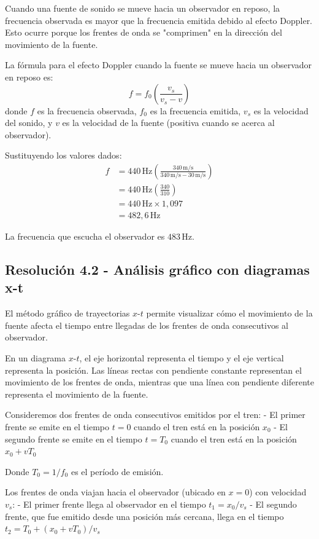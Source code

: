 \documentclass[
  11pt,
  letterpaper,
   addpoints,
   answers
  ]{exam}
\begin{document}
\begin{questions}
\begin{solution}
Cuando una fuente de sonido se mueve hacia un observador en reposo, la frecuencia observada es mayor que la frecuencia emitida debido al efecto Doppler. Esto ocurre porque los frentes de onda se "comprimen" en la dirección del movimiento de la fuente.

La fórmula para el efecto Doppler cuando la fuente se mueve hacia un observador en reposo es:
\begin{equation}
f = f_0 \left(\frac{v_s}{v_s - v}\right)
\end{equation}
donde $f$ es la frecuencia observada, $f_0$ es la frecuencia emitida, $v_s$ es la velocidad del sonido, y $v$ es la velocidad de la fuente (positiva cuando se acerca al observador).

Sustituyendo los valores dados:
\begin{align}
f &= 440\,\mathrm{Hz} \left(\frac{340\,\mathrm{m/s}}{340\,\mathrm{m/s} - 30\,\mathrm{m/s}}\right) \\
&= 440\,\mathrm{Hz} \left(\frac{340}{310}\right) \\
&= 440\,\mathrm{Hz} \times 1{,}097 \\
&= 482{,}6\,\mathrm{Hz}
\end{align}

La frecuencia que escucha el observador es $\boxed{483\,\mathrm{Hz}}$.

\subsection*{Resolución 4.2 - Análisis gráfico con diagramas x-t}

El método gráfico de trayectorias $x$-$t$ permite visualizar cómo el movimiento de la fuente afecta el tiempo entre llegadas de los frentes de onda consecutivos al observador.

En un diagrama $x$-$t$, el eje horizontal representa el tiempo y el eje vertical representa la posición. Las líneas rectas con pendiente constante representan el movimiento de los frentes de onda, mientras que una línea con pendiente diferente representa el movimiento de la fuente.

Consideremos dos frentes de onda consecutivos emitidos por el tren:
- El primer frente se emite en el tiempo $t = 0$ cuando el tren está en la posición $x_0$
- El segundo frente se emite en el tiempo $t = T_0$ cuando el tren está en la posición $x_0 + vT_0$

Donde $T_0 = 1/f_0$ es el período de emisión.

Los frentes de onda viajan hacia el observador (ubicado en $x = 0$) con velocidad $v_s$:
- El primer frente llega al observador en el tiempo $t_1 = x_0/v_s$
- El segundo frente, que fue emitido desde una posición más cercana, llega en el tiempo $t_2 = T_0 + (x_0 + vT_0)/v_s$


\end{solution}
\end{questions}
\end{document}
